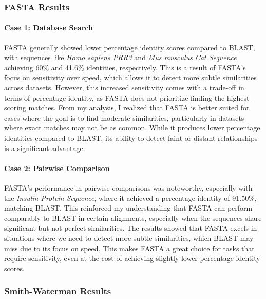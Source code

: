 \documentclass{article}
\begin{document}
\subsubsection{ FASTA Results}

\paragraph{Case 1: Database Search}
FASTA generally showed lower percentage identity scores compared to BLAST, with sequences like \textit{Homo sapiens PRR3} and \textit{Mus musculus Cat Sequence} achieving 60\% and 41.6\% identities, respectively. This is a result of FASTA’s focus on sensitivity over speed, which allows it to detect more subtle similarities across datasets. However, this increased sensitivity comes with a trade-off in terms of percentage identity, as FASTA does not prioritize finding the highest-scoring matches. From my analysis, I realized that FASTA is better suited for cases where the goal is to find moderate similarities, particularly in datasets where exact matches may not be as common. While it produces lower percentage identities compared to BLAST, its ability to detect faint or distant relationships is a significant advantage.

\paragraph{Case 2: Pairwise Comparison}
FASTA’s performance in pairwise comparisons was noteworthy, especially with the \textit{Insulin Protein Sequence}, where it achieved a percentage identity of 91.50\%, matching BLAST. This reinforced my understanding that FASTA can perform comparably to BLAST in certain alignments, especially when the sequences share significant but not perfect similarities. The results showed that FASTA excels in situations where we need to detect more subtle similarities, which BLAST may miss due to its focus on speed. This makes FASTA a great choice for tasks that require sensitivity, even at the cost of achieving slightly lower percentage identity scores.

\subsubsection{ Smith-Waterman Results}
\end{document}

